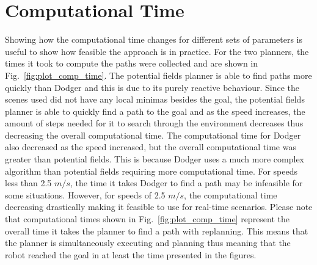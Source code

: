 \section{Computational Time}

Showing how the computational time changes for different sets of parameters is
useful to show how feasible the approach is in practice. For the two planners,
the times it took to compute the paths were collected and are shown in
Fig.~\ref{fig:plot_comp_time}. The potential fields planner is able to find
paths more quickly than Dodger and this is due to its purely reactive
behaviour.  Since the scenes used did not have any local minimas besides the
goal, the potential fields planner is able to quickly find a path to the goal
and as the speed increases, the amount of steps needed for it to search through
the environment decreases thus decreasing the overall computational time.  The
computational time for Dodger also decreased as the speed increased, but the
overall computational time was greater than potential fields. This is because
Dodger uses a much more complex algorithm than potential fields requiring more
computational time. For speeds less than 2.5 $m/s$, the time it takes Dodger to
find a path may be infeasible for some situations.  However, for speeds of 2.5
$m/s$, the computational time decreasing drastically making it feasible to use
for real-time scenarios.  Please note that computational times shown in
Fig.~\ref{fig:plot_comp_time} represent the overall time it takes the planner
to find a path with replanning.  This means that the planner is simultaneously
executing and planning thus meaning that the robot reached the goal in at least
the time presented in the figures.

